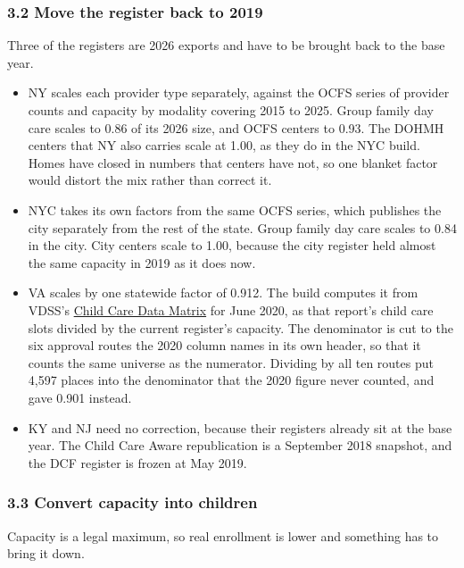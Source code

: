 \documentclass[11pt]{article}
\begin{document}
\subsubsection*{3.2 Move the register back to 2019}

Three of the registers are 2026 exports and have to be brought back to the base
year.

\begin{itemize}
\setlength{\itemsep}{0.45em}
\item NY scales each provider type separately, against the OCFS series of
      provider counts and capacity by modality covering 2015 to 2025. Group
      family day care scales to 0.86 of its 2026 size, and OCFS centers to 0.93.
      The DOHMH centers that NY also carries scale at 1.00, as they do in the
      NYC build. Homes have closed in numbers that centers have not, so one
      blanket factor would distort the mix rather than correct it.
\item NYC takes its own factors from the same OCFS series, which publishes the
      city separately from the rest of the state. Group family day care scales
      to 0.84 in the city. City centers scale to 1.00, because the city register
      held almost the same capacity in 2019 as it does now.
\item VA scales by one statewide factor of 0.912. The build computes it from
      VDSS's
      \href{https://data.virginia.gov/dataset/child-care-data-matrix-virginia-s-estimated-child-care-capacity-demand-june-2020}{Child
      Care Data Matrix} for June 2020, as that report's child care slots divided
      by the current register's capacity. The denominator is cut to the six
      approval routes the 2020 column names in its own header, so that it counts
      the same universe as the numerator. Dividing by all ten routes put 4,597
      places into the denominator that the 2020 figure never counted, and gave
      0.901 instead.
\item KY and NJ need no correction, because their registers already sit at the
      base year. The Child Care Aware republication is a September 2018
      snapshot, and the DCF register is frozen at May 2019.
\end{itemize}

\subsubsection*{3.3 Convert capacity into children}

Capacity is a legal maximum, so real enrollment is lower and something has to
bring it down.
\end{document}
